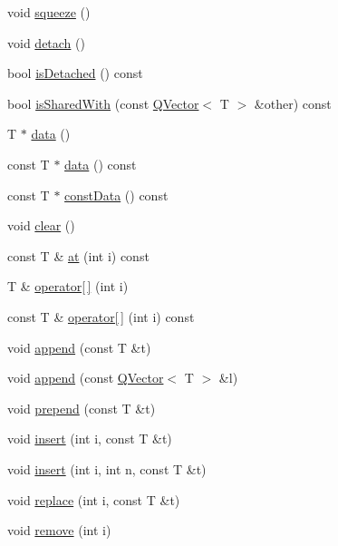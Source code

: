 \begin{DoxyCompactItemize}
\item 
void \hyperlink{class_q_vector_a8e0d583fe677dad6afd11ed4bc8b8927}{squeeze} ()
\item 
void \hyperlink{class_q_vector_a08d0d1da157ccc4b3de98ac618fab8e6}{detach} ()
\item 
bool \hyperlink{class_q_vector_af229e85b6aa5891a437b3efde705ceea}{is\+Detached} () const 
\item 
bool \hyperlink{class_q_vector_a05ceccc2b7cc2bebfcd9e05ee9406a0e}{is\+Shared\+With} (const \hyperlink{class_q_vector}{Q\+Vector}$<$ T $>$ \&other) const 
\item 
T $\ast$ \hyperlink{class_q_vector_acc8068ddfe8bc93852558914a5e73b5a}{data} ()
\item 
const T $\ast$ \hyperlink{class_q_vector_a0170fb9ced08d46ad0724049a1b7d680}{data} () const 
\item 
const T $\ast$ \hyperlink{class_q_vector_a598509c9fe544e8a47e375f47b5c8f50}{const\+Data} () const 
\item 
void \hyperlink{class_q_vector_a4ec0b396f1d5138386800318ca7d3a0d}{clear} ()
\item 
const T \& \hyperlink{class_q_vector_ab97dbaa9b950ec9c3f3ac51bb602235c}{at} (int i) const 
\item 
T \& \hyperlink{class_q_vector_a145585285bf96d5fcd8ce10f7bc6ec3e}{operator\mbox{[}$\,$\mbox{]}} (int i)
\item 
const T \& \hyperlink{class_q_vector_a4abb4e10e8ea7bcad4819f21c13711f2}{operator\mbox{[}$\,$\mbox{]}} (int i) const 
\item 
void \hyperlink{class_q_vector_ad3536b6c85748f8b0b376d5d9ba0e721}{append} (const T \&t)
\item 
void \hyperlink{class_q_vector_a35a429cf3858d3c58246229b2cc18e93}{append} (const \hyperlink{class_q_vector}{Q\+Vector}$<$ T $>$ \&l)
\item 
void \hyperlink{class_q_vector_a94da89ec9a0c1b5205065ecf08ec1a7d}{prepend} (const T \&t)
\item 
void \hyperlink{class_q_vector_a8567b12d7fa5d23de69ba87e27646ee5}{insert} (int i, const T \&t)
\item 
void \hyperlink{class_q_vector_afb2c6bd6b45f3ce73f4c6556d492af53}{insert} (int i, int n, const T \&t)
\item 
void \hyperlink{class_q_vector_a488cf341031679a18361c89111794059}{replace} (int i, const T \&t)
\item 
void \hyperlink{class_q_vector_a795fabfd2431ce0878ff4ba3c06e7e2b}{remove} (int i)
\item 

\end{DoxyCompactItemize}

